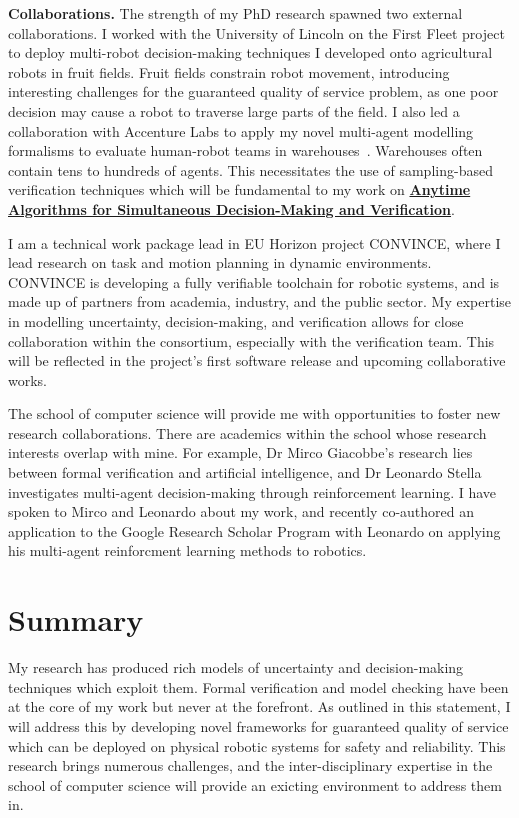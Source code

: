 \documentclass[12pt]{article}
\newcommand{\anytime}{\hyperlink{topicthree}{\textbf{Anytime Algorithms for Simultaneous Decision-Making and Verification}}}
\begin{document}
\vspace*{1ex}\noindent\textbf{Collaborations.} The strength of my PhD research spawned two external collaborations.
%
I worked with the University of Lincoln on the First Fleet project to deploy multi-robot decision-making techniques I developed onto agricultural robots in fruit fields.
%
Fruit fields constrain robot movement, introducing interesting challenges for the guaranteed quality of service problem, as one poor decision may cause a robot to traverse large parts of the field.
%
I also led a collaboration with Accenture Labs to apply my novel multi-agent modelling formalisms to evaluate human-robot teams in warehouses~\cite{street2022context,street2023analysing}.
%
Warehouses often contain tens to hundreds of agents.
%
This necessitates the use of sampling-based verification techniques which will be fundamental to my work on \anytime. 


I am a technical work package lead in EU Horizon project CONVINCE, where I lead research on task and motion planning in dynamic environments.
%
CONVINCE is developing a fully verifiable toolchain for robotic systems, and is made up of partners from academia, industry, and the public sector.
%
My expertise in modelling uncertainty, decision-making, and verification allows for close collaboration within the consortium, especially with the verification team.
%
This will be reflected in the project's first software release and upcoming collaborative works.

The school of computer science will provide me with opportunities to foster new research collaborations.
%
There are academics within the school whose research interests overlap with mine.
%
For example, Dr Mirco Giacobbe's research lies between formal verification and artificial intelligence, and Dr Leonardo Stella investigates multi-agent decision-making through reinforcement learning.
%
I have spoken to Mirco and Leonardo about my work, and recently co-authored an application to the Google Research Scholar Program with Leonardo on applying his multi-agent reinforcment learning methods to robotics.


\section*{Summary}

My research has produced rich models of uncertainty and decision-making techniques which exploit them.
%
Formal verification and model checking have been at the core of my work but never at the forefront.
%
As outlined in this statement, I will address this by developing novel frameworks for guaranteed quality of service which can be deployed on physical robotic systems for safety and reliability.
%
This research brings numerous challenges, and the inter-disciplinary expertise in the school of computer science will provide an exicting environment to address them in.

\printbibliography
\end{document}
